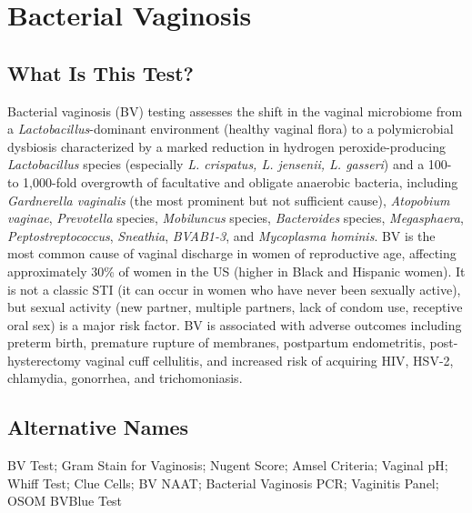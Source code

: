 \chapter{Bacterial Vaginosis}

\section*{What Is This Test?}
Bacterial vaginosis (BV) testing assesses the shift in the vaginal microbiome from a \textit{Lactobacillus}-dominant environment (healthy vaginal flora) to a polymicrobial dysbiosis characterized by a marked reduction in hydrogen peroxide-producing \textit{Lactobacillus} species (especially \textit{L. crispatus, L. jensenii, L. gasseri}) and a 100- to 1,000-fold overgrowth of facultative and obligate anaerobic bacteria, including \textit{Gardnerella vaginalis} (the most prominent but not sufficient cause), \textit{Atopobium vaginae}, \textit{Prevotella} species, \textit{Mobiluncus} species, \textit{Bacteroides} species, \textit{Megasphaera}, \textit{Peptostreptococcus}, \textit{Sneathia}, \textit{BVAB1-3}, and \textit{Mycoplasma hominis}. BV is the most common cause of vaginal discharge in women of reproductive age, affecting approximately 30\% of women in the US (higher in Black and Hispanic women). It is not a classic STI (it can occur in women who have never been sexually active), but sexual activity (new partner, multiple partners, lack of condom use, receptive oral sex) is a major risk factor. BV is associated with adverse outcomes including preterm birth, premature rupture of membranes, postpartum endometritis, post-hysterectomy vaginal cuff cellulitis, and increased risk of acquiring HIV, HSV-2, chlamydia, gonorrhea, and trichomoniasis.

\section*{Alternative Names}
BV Test; Gram Stain for Vaginosis; Nugent Score; Amsel Criteria; Vaginal pH; Whiff Test; Clue Cells; BV NAAT; Bacterial Vaginosis PCR; Vaginitis Panel; OSOM BVBlue Test

